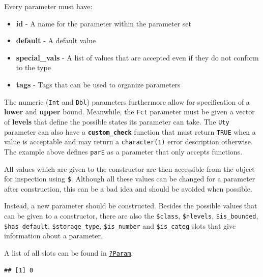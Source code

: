 \documentclass[]{scrbook}
\newenvironment{Shaded}{\begin{snugshade}}{\end{snugshade}}
\newcommand{\NormalTok}[1]{#1}
\newcommand{\OperatorTok}[1]{\textcolor[rgb]{0.81,0.36,0.00}{\textbf{#1}}}
\providecommand{\tightlist}{%
  \setlength{\itemsep}{0pt}\setlength{\parskip}{0pt}}
\renewenvironment{Shaded} {\begin{snugshade}\small} {\end{snugshade}}
\begin{document}
Every parameter must have:

\begin{itemize}
\tightlist
\item
  \textbf{id} - A name for the parameter within the parameter set
\item
  \textbf{default} - A default value
\item
  \textbf{special\_vals} - A list of values that are accepted even if they do not conform to the type
\item
  \textbf{tags} - Tags that can be used to organize parameters
\end{itemize}

The numeric (\texttt{Int} and \texttt{Dbl}) parameters furthermore allow for specification of a \textbf{lower} and \textbf{upper} bound.
Meanwhile, the \texttt{Fct} parameter must be given a vector of \textbf{levels} that define the possible states its parameter can take.
The \texttt{Uty} parameter can also have a \textbf{\texttt{custom\_check}} function that must return \texttt{TRUE} when a value is acceptable and may return a \texttt{character(1)} error description otherwise.
The example above defines \texttt{parE} as a parameter that only accepts functions.

All values which are given to the constructor are then accessible from the object for inspection using \texttt{\$}.
Although all these values can be changed for a parameter after construction, this can be a bad idea and should be avoided when possible.

Instead, a new parameter should be constructed.
Besides the possible values that can be given to a constructor, there are also the \texttt{\$class}, \texttt{\$nlevels}, \texttt{\$is\_bounded}, \texttt{\$has\_default}, \texttt{\$storage\_type}, \texttt{\$is\_number} and \texttt{\$is\_categ} slots that give information about a parameter.

A list of all slots can be found in \href{https://paradox.mlr-org.com/reference/Param.html}{\texttt{?Param}}.

\begin{Shaded}
\end{Shaded}

\begin{verbatim}
## [1] 0
\end{verbatim}

\begin{Shaded}
\end{Shaded}
\end{document}
